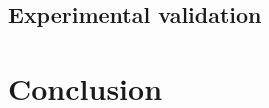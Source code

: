 \documentclass[a4paper,fleqn]{cas-sc}
\begin{document}
\subsection{Experimental validation}




\section{Conclusion}

%
%
%
\end{document}
